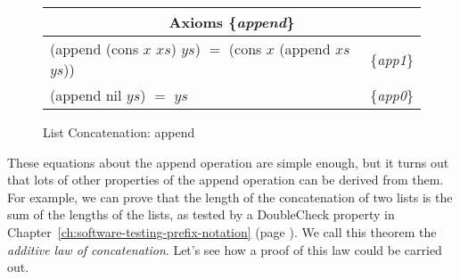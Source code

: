 \begin{figure}
\begin{tabular}{ll}
\multicolumn{2}{c}{Axioms \{\emph{append}\}} \\
\hline
\textsf{(append (cons $x$ $xs$) $ys$)} $=$ \textsf{(cons $x$ (append $xs$ $ys$))} & \{\emph{app1}\} \\
\textsf{(append nil $ys$)} $=$  $ys$                                     & \{\emph{app0}\} \\
\end{tabular}
\caption{List Concatenation: \textsf{append}}
\label{append-equations}
\end{figure}

These equations about the append operation are simple enough,
but it turns out that lots of other properties of the
\textsf{append} operation can be derived from them.
For example, we can prove that the length of
the concatenation of two lists is the sum of the lengths of the lists,
as tested by a DoubleCheck property in
Chapter~\ref{ch:software-testing-prefix-notation} (page \pageref{additive-lengths-test}).
We call this theorem the \emph{additive law of concatenation}.
Let's see how a proof of this law could be carried out.


